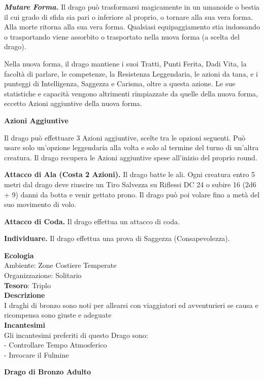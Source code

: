 \begin{multicols}{2}
\textit{\textbf{Mutare Forma.}} Il drago può trasformarsi magicamente in un umanoide o bestia il cui grado di sfida sia pari o inferiore al proprio, o tornare alla sua vera forma. Alla morte ritorna alla sua vera forma. Qualsiasi equipaggiamento stia indossando o trasportando viene assorbito o trasportato nella nuova forma (a scelta del drago).

Nella nuova forma, il drago mantiene i suoi Tratti, Punti Ferita, Dadi Vita, la facoltà di parlare, le competenze, la Resistenza Leggendaria, le azioni da tana, e i punteggi di Intelligenza, Saggezza e Carisma, oltre a questa azione. Le sue statistiche e capacità vengono altrimenti rimpiazzate da quelle della nuova forma, eccetto Azioni aggiuntive della nuova forma.

\textbf{Azioni Aggiuntive}

Il drago può effettuare 3 Azioni aggiuntive, scelte tra le opzioni seguenti. Può usare solo un'opzione leggendaria alla volta e solo al termine del turno di un'altra creatura. Il drago recupera le Azioni aggiuntive spese all'inizio del proprio round.

\textbf{Attacco di Ala (Costa 2 Azioni).} Il drago batte le ali. Ogni creatura entro 5 metri dal drago deve riuscire un Tiro Salvezza su Riflessi DC 24 o subire 16 (2d6 + 9) danni da botta e venir gettato prono. Il drago può poi volare fino a metà del suo movimento di volo.

\textbf{Attacco di Coda.} Il drago effettua un attacco di coda.

\textbf{Individuare.} Il drago effettua una prova di Saggezza (Consapevolezza).

\textbf{Ecologia}\\
Ambiente: Zone Costiere Temperate\\
Organizzazione: Solitario\\
\textbf{Tesoro}: Triplo\\
\textbf{Descrizione}\\
I draghi di bronzo sono noti per allearsi con viaggiatori ed avventurieri se causa e ricompensa sono giuste e adeguate\\
\textbf{Incantesimi}\\
Gli incantesimi preferiti di questo Drago sono:\\
- Controllare Tempo Atmosferico\\
- Invocare il Fulmine


\medskip{}\textbf{Drago di Bronzo Adulto}


\end{multicols}
